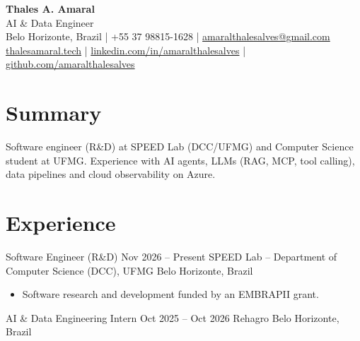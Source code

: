 \documentclass[10pt,a4paper]{article}
\begin{document}

\begin{center}
    {\Large\bfseries Thales A. Amaral}\\[2pt]
    AI \& Data Engineer\\[3pt]

    Belo Horizonte, Brazil
    \quad | \quad
    +55 37 98815-1628
    \quad | \quad
    \href{mailto:amaralthalesalves@gmail.com}{amaralthalesalves@gmail.com}\\[2pt]

    \href{https://thalesamaral.tech}{thalesamaral.tech}
    \quad | \quad
    \href{https://www.linkedin.com/in/amaralthalesalves/}{linkedin.com/in/amaralthalesalves}
    \quad | \quad
    \href{https://github.com/amaralthalesalves}{github.com/amaralthalesalves}
\end{center}

\section*{Summary}

Software engineer (R\&D) at SPEED Lab (DCC/UFMG) and Computer Science student at UFMG.
Experience with AI agents, LLMs (RAG, MCP, tool calling), data pipelines and cloud observability on Azure.

\section*{Experience}

\entry
{Software Engineer (R\&D)}
{Nov 2026 -- Present}
{SPEED Lab -- Department of Computer Science (DCC), UFMG}
{Belo Horizonte, Brazil}

\begin{itemize}
    \item Software research and development funded by an EMBRAPII grant.
\end{itemize}

\entry
{AI \& Data Engineering Intern}
{Oct 2025 -- Oct 2026}
{Rehagro}
{Belo Horizonte, Brazil}
\end{document}
